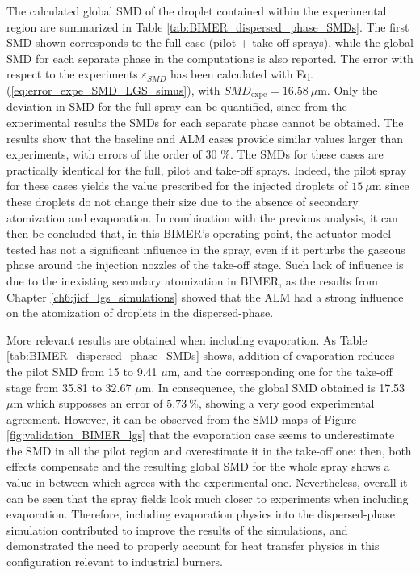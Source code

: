 The calculated global SMD of the droplet contained within the experimental region are summarized in Table \ref{tab:BIMER_dispersed_phase_SMDs}.  The first SMD shown corresponds to the full case (pilot + take-off sprays), while the global SMD for each separate phase in the computations is also reported.  The error with respect to the experiments $\varepsilon_{SMD}$ has been calculated with Eq. (\ref{eq:error_expe_SMD_LGS_simus}), with $SMD_\mathrm{expe} = 16.58~\mu$m. Only the deviation in SMD for the full spray can be quantified, since from the experimental results the SMDs for each separate phase cannot be obtained. The results show that the baseline and ALM cases provide similar values larger than experiments, with errors of the order of 30 $\%$. The SMDs for these cases are practically identical for the full, pilot and take-off sprays. Indeed, the pilot spray for these cases yields the value prescribed for the injected droplets of $15~\mu$m since these droplets do not change their size due to the absence of secondary atomization and evaporation. In combination with the previous analysis, it can then be concluded that, in this BIMER's operating point, the actuator model tested has not a significant influence in the spray, even if it perturbs the gaseous phase around the injection nozzles of the take-off stage. Such lack of influence is due to the inexisting secondary atomization in BIMER, as the results from Chapter \ref{ch6:jicf_lgs_simulations} showed that the ALM had a strong influence on the atomization of droplets in the dispersed-phase. 

More relevant results are obtained when including evaporation. As Table \ref{tab:BIMER_dispersed_phase_SMDs} shows, addition of evaporation reduces the pilot SMD from 15 to 9.41 $\mu$m, and the corresponding one for the take-off stage from 35.81 to 32.67 $\mu$m. In consequence, the global SMD obtained is 17.53 $\mu$m which supposses an error of $5.73~\%$, showing a very good experimental agreement. However, it can be observed from the SMD maps of Figure \ref{fig:validation_BIMER_lgs} that the evaporation case seems to underestimate the SMD in all the pilot region and overestimate it in the take-off one: then, both effects compensate and the resulting global SMD for the whole spray shows a value in between which agrees with the experimental one. Nevertheless, overall it can be seen that the spray fields look much closer to experiments when including evaporation. Therefore, including evaporation physics into the dispersed-phase simulation contributed to improve the results of the simulations, and demonstrated the need to properly account for heat transfer physics in this configuration relevant to industrial burners.



